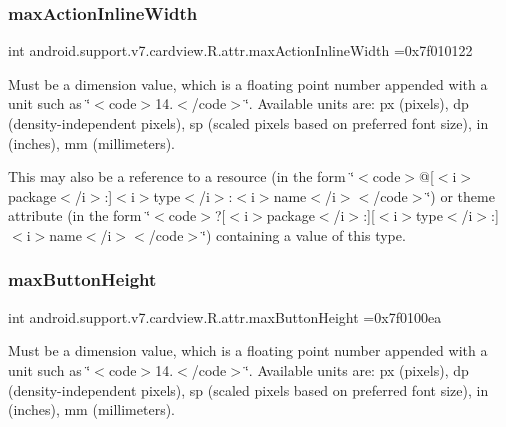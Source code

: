 \subsubsection{\texorpdfstring{max\+Action\+Inline\+Width}{maxActionInlineWidth}}
{\footnotesize\ttfamily int android.\+support.\+v7.\+cardview.\+R.\+attr.\+max\+Action\+Inline\+Width =0x7f010122\hspace{0.3cm}{\ttfamily [static]}}

Must be a dimension value, which is a floating point number appended with a unit such as \char`\"{}$<$code$>$14.\+5sp$<$/code$>$\char`\"{}. Available units are\+: px (pixels), dp (density-\/independent pixels), sp (scaled pixels based on preferred font size), in (inches), mm (millimeters). 

This may also be a reference to a resource (in the form \char`\"{}$<$code$>$@\mbox{[}$<$i$>$package$<$/i$>$\+:\mbox{]}$<$i$>$type$<$/i$>$\+:$<$i$>$name$<$/i$>$$<$/code$>$\char`\"{}) or theme attribute (in the form \char`\"{}$<$code$>$?\mbox{[}$<$i$>$package$<$/i$>$\+:\mbox{]}\mbox{[}$<$i$>$type$<$/i$>$\+:\mbox{]}$<$i$>$name$<$/i$>$$<$/code$>$\char`\"{}) containing a value of this type. \mbox{\label{classandroid_1_1support_1_1v7_1_1cardview_1_1R_1_1attr_ac1e386294c7f266fd78e00b818be9a3d}} 
\subsubsection{\texorpdfstring{max\+Button\+Height}{maxButtonHeight}}
{\footnotesize\ttfamily int android.\+support.\+v7.\+cardview.\+R.\+attr.\+max\+Button\+Height =0x7f0100ea\hspace{0.3cm}{\ttfamily [static]}}

Must be a dimension value, which is a floating point number appended with a unit such as \char`\"{}$<$code$>$14.\+5sp$<$/code$>$\char`\"{}. Available units are\+: px (pixels), dp (density-\/independent pixels), sp (scaled pixels based on preferred font size), in (inches), mm (millimeters). 

